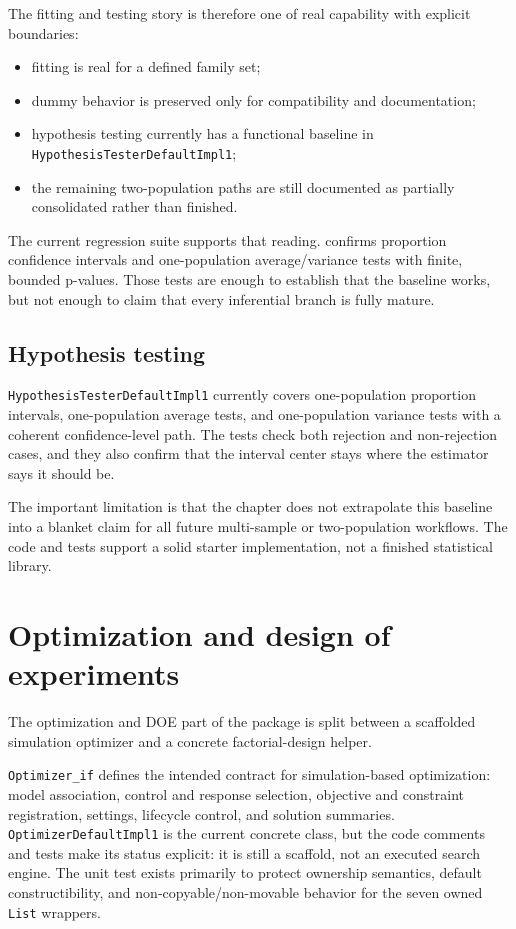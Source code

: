 The fitting and testing story is therefore one of real capability with explicit boundaries:
\begin{itemize}
\item fitting is real for a defined family set;
\item dummy behavior is preserved only for compatibility and documentation;
\item hypothesis testing currently has a functional baseline in \texttt{HypothesisTesterDefaultImpl1};
\item the remaining two-population paths are still documented as partially consolidated rather than finished.
\end{itemize}

The current regression suite supports that reading.  confirms proportion confidence intervals and one-population average/variance tests with finite, bounded p-values. Those tests are enough to establish that the baseline works, but not enough to claim that every inferential branch is fully mature.

\subsection{Hypothesis testing}
\label{subsec:tools-hypothesis-testing}

\texttt{HypothesisTesterDefaultImpl1} currently covers one-population proportion intervals, one-population average tests, and one-population variance tests with a coherent confidence-level path. The tests check both rejection and non-rejection cases, and they also confirm that the interval center stays where the estimator says it should be.

The important limitation is that the chapter does not extrapolate this baseline into a blanket claim for all future multi-sample or two-population workflows. The code and tests support a solid starter implementation, not a finished statistical library.

\section{Optimization and design of experiments}
\label{sec:tools-optimization-doe}

The optimization and DOE part of the package is split between a scaffolded simulation optimizer and a concrete factorial-design helper.

\texttt{Optimizer\_if} defines the intended contract for simulation-based optimization: model association, control and response selection, objective and constraint registration, settings, lifecycle control, and solution summaries. \texttt{OptimizerDefaultImpl1} is the current concrete class, but the code comments and tests make its status explicit: it is still a scaffold, not an executed search engine. The unit test  exists primarily to protect ownership semantics, default constructibility, and non-copyable/non-movable behavior for the seven owned \texttt{List} wrappers.

